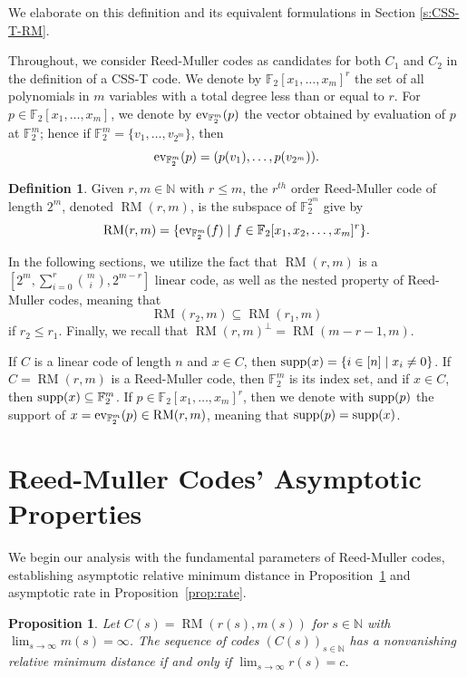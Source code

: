 \documentclass{amsart}
\newtheorem{proposition}[theorem]{Proposition}
\theoremstyle{definition}
\newtheorem{definition}[theorem]{Definition}
\newcommand{\F}{{\mathbb{F}}}
\newcommand{\N}{{\mathbb{N}}}
\newcommand{\polyring}[1]{\F_2[x_1,\dots,x_m]^{#1}}
\newcommand{\ev}{\textnormal{ev}_{\F_2^m}}
\newcommand{\supp}{\textnormal{supp}}
\DeclareMathOperator{\RM}{RM}
\begin{document}
We elaborate on this definition and its equivalent formulations in Section \ref{s:CSS-T-RM}. 

Throughout, we consider Reed-Muller codes as candidates for both $C_1$ and $C_2$ in the definition of a CSS-T code. 
We denote by $\polyring{r}$ the set of all polynomials in $m$ variables with a total degree less than or equal to $r$. For $p\in \polyring{}$, we denote by $\ev(p)$ the vector obtained by evaluation of $p$ at $\F_2^m$; hence if $\F_2^m=\{v_1,\dots,v_{2^m}\}$, then 
\[\ev(p)=(p(v_1),\dots,p(v_{2^m})).\]

\begin{definition}
Given $r, m \in \N$ with $r\leq m$, the $r^{th}$ order Reed-Muller code of length $2^m$, denoted $\RM(r,m)$, is the subspace of $\F_2^{2^m}$ give by 
\[\RM(r,m) = \{ \ev(f) \mid f \in \F_2[x_1, x_2, \ldots, x_m]^r\}.\]
\end{definition}

In the following sections, we utilize the fact that $\RM(r,m)$ is a $[2^m, \sum_{i=0}^r {m\choose i}, 2^{m-r}]$ linear code, as well as the nested property of Reed-Muller codes, meaning that \[\RM(r_2, m) \subseteq \RM(r_1,m)\] if $r_2 \leq r_1$. Finally, we recall that $\RM(r,m)^\perp = \RM(m-r-1, m)$. 

If $C$ is a linear code of length $n$ and $x\in C$, then $\supp(x)=\{i\in [n] \mid x_i\neq 0\}$. If $C=\RM(r,m)$ is a Reed-Muller code, then $\F_2^m$ is its index set, and if $x\in C$, then $\supp(x)\subseteq \F_2^m$. If $p\in \polyring{r}$, then we denote with $\supp(p)$ the support of $x=\ev(p)\in \RM(r,m)$, meaning that $\supp(p)=\supp(x)$.



\section{Reed-Muller Codes' Asymptotic Properties }\label{s:asympt}

We begin our analysis with the fundamental parameters of Reed-Muller codes, establishing asymptotic relative minimum distance in Proposition~\ref{prop:dist} and asymptotic rate in Proposition~\ref{prop:rate}.
\begin{proposition}
Let $C(s)= \RM(r(s), m(s))$ for $s\in \N$ with $\lim_{s\to \infty}m(s)=\infty$. The sequence of codes $(C(s))_{s\in \N}$ has a nonvanishing relative minimum distance if and only if $\lim_{s \to \infty} r(s) = c$.
\label{prop:dist}
\end{proposition}
\end{document}
